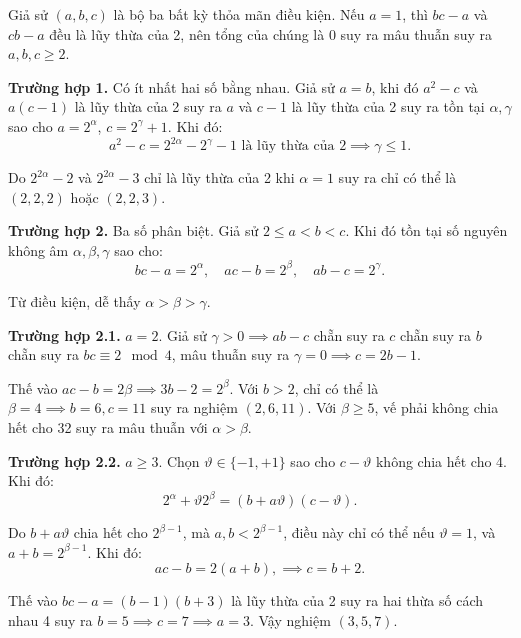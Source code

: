 \begin{problem}
\begin{problem}
\begin{soln}
    Giả sử \( (a, b, c) \) là bộ ba bất kỳ thỏa mãn điều kiện. Nếu \( a = 1 \), thì \( bc - a \) và \( cb - a \) đều là lũy thừa của 2,
    nên tổng của chúng là 0 suy ra mâu thuẫn suy ra \( a, b, c \ge 2 \).

    \textbf{Trường hợp 1.} Có ít nhất hai số bằng nhau. Giả sử \( a = b \), khi đó \( a^2 - c \) và \( a(c - 1) \) là lũy thừa của 2
    suy ra \( a \) và \( c - 1 \) là lũy thừa của 2 suy ra tồn tại \( \alpha, \gamma \) sao cho \( a = 2^\alpha \), \( c = 2^\gamma + 1 \). Khi đó:
    \[
        a^2 - c = 2^{2\alpha} - 2^\gamma - 1 \text{ là lũy thừa của 2} \implies \gamma \le 1.
    \]

    Do \( 2^{2\alpha} - 2 \) và \( 2^{2\alpha} - 3 \) chỉ là lũy thừa của 2 khi \( \alpha = 1 \) suy ra chỉ có thể là \( (2, 2, 2) \) hoặc \( (2, 2, 3) \).

    \textbf{Trường hợp 2.} Ba số phân biệt. Giả sử \( 2 \le a < b < c \). Khi đó tồn tại số nguyên không âm \( \alpha, \beta, \gamma \) sao cho:
    \[
        bc - a = 2^\alpha, \quad ac - b = 2^\beta, \quad ab - c = 2^\gamma.
    \]

    Từ điều kiện, dễ thấy \( \alpha > \beta > \gamma \).

    \textbf{Trường hợp 2.1.} \( a = 2 \). Giả sử \( \gamma > 0 \implies ab - c \) chẵn suy ra \( c \) chẵn
    suy ra \( b \) chẵn suy ra \( bc \equiv 2 \mod 4 \), mâu thuẫn suy ra \( \gamma = 0 \implies c = 2b - 1 \).

    Thế vào \( ac - b = 2\beta \implies 3b - 2 = 2^\beta \). Với \( b > 2 \), chỉ có thể là \( \beta = 4 \implies b = 6, c = 11 \)
    suy ra nghiệm \( (2, 6, 11) \). Với \( \beta \ge 5 \), vế phải không chia hết cho 32 suy ra mâu thuẫn với \( \alpha > \beta \).

    \textbf{Trường hợp 2.2.} \( a \ge 3 \). Chọn \( \vartheta \in \{-1, +1\} \) sao cho \( c - \vartheta \) không chia hết cho 4. Khi đó:
    \[
        2^\alpha + \vartheta 2^\beta = (b + a\vartheta)(c - \vartheta).
    \]
    
    Do \( b + a\vartheta \) chia hết cho \( 2^{\beta - 1} \), mà \( a, b < 2^{\beta - 1} \),
    điều này chỉ có thể nếu \( \vartheta = 1 \), và \( a + b = 2^{\beta - 1} \). Khi đó:
    \[
        ac - b = 2(a + b), \implies c = b + 2.
    \]

    Thế vào \( bc - a = (b - 1)(b + 3) \) là lũy thừa của 2 suy ra hai thừa số cách nhau 4
    suy ra \( b = 5 \implies c = 7 \implies a = 3 \). Vậy nghiệm \( (3, 5, 7) \).
\end{soln}


\end{problem}
\end{problem}
